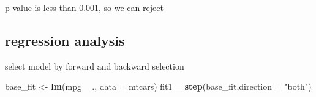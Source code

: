 \documentclass[
]{article}
\newenvironment{Shaded}{\begin{snugshade}}{\end{snugshade}}
\newcommand{\DataTypeTok}[1]{\textcolor[rgb]{0.13,0.29,0.53}{#1}}
\newcommand{\KeywordTok}[1]{\textcolor[rgb]{0.13,0.29,0.53}{\textbf{#1}}}
\newcommand{\NormalTok}[1]{#1}
\newcommand{\OperatorTok}[1]{\textcolor[rgb]{0.81,0.36,0.00}{\textbf{#1}}}
\newcommand{\StringTok}[1]{\textcolor[rgb]{0.31,0.60,0.02}{#1}}
\begin{document}
p-value is less than 0.001, so we can reject

\hypertarget{regression-analysis}{%
\subsection{regression analysis}\label{regression-analysis}}

select model by forward and backward selection

\begin{Shaded}
\begin{Highlighting}[]
\NormalTok{base_fit <-}\StringTok{ }\KeywordTok{lm}\NormalTok{(mpg }\OperatorTok{~}\StringTok{ }\NormalTok{., }\DataTypeTok{data =}\NormalTok{ mtcars)}
\NormalTok{fit1 =}\StringTok{ }\KeywordTok{step}\NormalTok{(base_fit,}\DataTypeTok{direction =} \StringTok{"both"}\NormalTok{)}
\end{Highlighting}
\end{Shaded}
\end{document}
